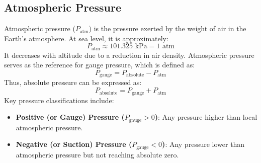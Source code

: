 \documentclass{article}
\begin{document}
\subsection{Atmospheric Pressure}
Atmospheric pressure ($P_{\text{atm}}$) is the pressure exerted by the weight of air in the Earth's atmosphere. At sea level, it is approximately:
\begin{equation*}
	P_{\text{atm}} \approx 101.325 \text{ kPa} = 1 \text{ atm}
\end{equation*}
It decreases with altitude due to a reduction in air density. Atmospheric pressure serves as the reference for gauge pressure, which is defined as:
\begin{equation}
	P_{\text{gauge}} = P_{\text{absolute}} - P_{\text{atm}}
\end{equation}
Thus, absolute pressure can be expressed as:
\begin{equation}
	P_{\text{absolute}} = P_{\text{gauge}} + P_{\text{atm}}
	\label{eq:absolute}
\end{equation}
Key pressure classifications include:\\
\vspace{-1em}
\begin{itemize}
	\item \textbf{Positive (or Gauge) Pressure ($P_{\text{gauge}} > 0$)}: Any pressure higher than local atmospheric pressure.
	\item \textbf{Negative (or Suction) Pressure ($P_{\text{gauge}} < 0$)}: Any pressure lower than atmospheric pressure but not reaching absolute zero.
\end{itemize}
\end{document}
